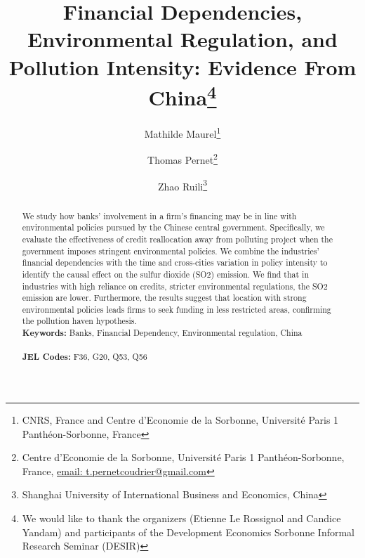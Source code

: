 \documentclass[12pt]{article}
\begin{document}
\begin{titlepage}

\title{Financial Dependencies, Environmental Regulation, and Pollution Intensity: Evidence From China\thanks{We would like to thank the organizers (Etienne Le Rossignol and Candice Yandam) and participants of the Development Economics Sorbonne Informal Research Seminar (DESIR)}}
\author{
Mathilde Maurel\thanks{CNRS, France and Centre d'Economie de la Sorbonne, Université Paris 1 Panthéon-Sorbonne, France} 
\and Thomas Pernet\thanks{Centre d'Economie de la Sorbonne, Université Paris 1 Panthéon-Sorbonne, France,
\href{mailto:t.pernetcoudrier@gmail.com}{email: t.pernetcoudrier@gmail.com} 
}
\and Zhao Ruili\thanks{Shanghai University of International Business and Economics, China}
}

\date{}

\maketitle
\begin{abstract}
\noindent We study how banks' involvement in a firm's financing may be in line with environmental policies pursued by the Chinese central government. Specifically, we evaluate the effectiveness of credit reallocation away from polluting project when the government imposes stringent environmental policies. We combine the industries' financial dependencies with the time and cross-cities variation in policy intensity to identify the causal effect on the sulfur dioxide (SO2) emission. We find that in industries with high reliance on credits, stricter environmental regulations, the SO2 emission are lower. Furthermore, the results suggest that location with strong environmental policies leads firms to seek funding in less restricted areas, confirming the pollution haven hypothesis.
\vspace{0em}\\
\noindent\textbf{Keywords:} Banks, Financial Dependency, Environmental regulation, China\\
\vspace{0em}\\
\noindent\textbf{JEL Codes:} F36, G20, Q53, Q56\\

\bigskip
\end{abstract}
\setcounter{page}{0}
\thispagestyle{empty}
\end{titlepage}
\pagebreak \newpage
\end{document}
